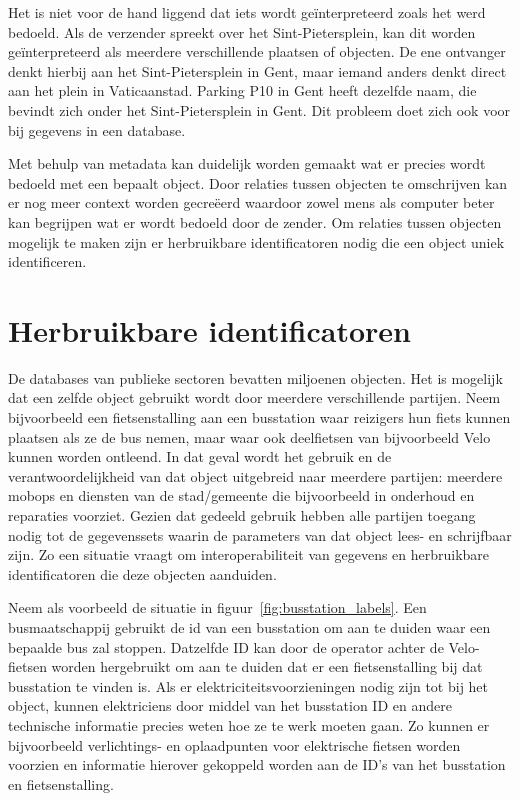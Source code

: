 Het is niet voor de hand liggend dat iets wordt geïnterpreteerd zoals het werd bedoeld. Als de verzender spreekt over het Sint-Pietersplein, kan dit worden geïnterpreteerd als meerdere verschillende plaatsen of objecten. De ene ontvanger denkt hierbij aan het Sint-Pietersplein in Gent, maar iemand anders denkt direct aan het plein in Vaticaanstad. Parking P10 in Gent heeft dezelfde naam, die bevindt zich onder het Sint-Pietersplein in Gent. Dit probleem doet zich ook voor bij gegevens in een database.

Met behulp van metadata kan duidelijk worden gemaakt wat er precies wordt bedoeld met een bepaalt object. Door relaties tussen objecten te omschrijven kan er nog meer context worden gecreëerd waardoor zowel mens als computer beter kan begrijpen wat er wordt bedoeld door de zender. Om relaties tussen objecten mogelijk te maken zijn er herbruikbare identificatoren nodig die een object uniek identificeren.

\section{Herbruikbare identificatoren}
\label{sec:herbruikbare_ids}
De databases van publieke sectoren bevatten miljoenen objecten. Het is mogelijk dat een zelfde object gebruikt wordt door meerdere verschillende partijen. Neem bijvoorbeeld een fietsenstalling aan een busstation waar reizigers hun fiets kunnen plaatsen als ze de bus nemen, maar waar ook deelfietsen van bijvoorbeeld Velo kunnen worden ontleend. In dat geval wordt het gebruik en de verantwoordelijkheid van dat object uitgebreid naar meerdere partijen: meerdere \glspl{mobop} en diensten van de stad/gemeente die bijvoorbeeld in onderhoud en reparaties voorziet. Gezien dat gedeeld gebruik hebben alle partijen toegang nodig tot de gegevenssets waarin de parameters van dat object lees- en schrijfbaar zijn. Zo een situatie vraagt om interoperabiliteit van gegevens en herbruikbare identificatoren die deze objecten aanduiden. 

Neem als voorbeeld de situatie in figuur~\ref{fig:busstation_labels}. Een busmaatschappij gebruikt de \acrfull{id} van een busstation om aan te duiden waar een bepaalde bus zal stoppen. Datzelfde ID kan door de operator achter de Velo-fietsen worden hergebruikt om aan te duiden dat er een fietsenstalling bij dat busstation te vinden is. Als er elektriciteitsvoorzieningen nodig zijn tot bij het object, kunnen elektriciens door middel van het busstation ID en andere technische informatie precies weten hoe ze te werk moeten gaan. Zo kunnen er bijvoorbeeld verlichtings- en oplaadpunten voor elektrische fietsen worden voorzien en informatie hierover gekoppeld worden aan de ID's van het busstation en fietsenstalling.

